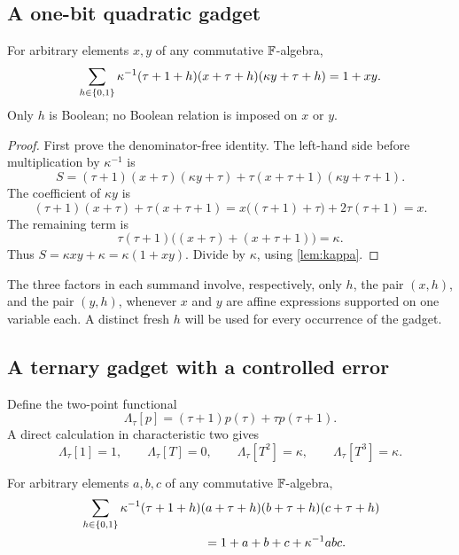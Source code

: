 \subsection{A one-bit quadratic gadget}

\begin{lemma}\label{lem:quadratic}
For arbitrary elements \(x,y\) of any commutative \(\mathbb{F}\)-algebra,
\[
\sum_{h\in\{0,1\}}
  \kappa^{-1}(\tau+1+h)(x+\tau+h)(\kappa y+\tau+h)
 =1+xy.
\]
Only \(h\) is Boolean; no Boolean relation is imposed on \(x\) or \(y\).
\end{lemma}

\begin{proof}
First prove the denominator-free identity.  The left-hand side before multiplication by
\(\kappa^{-1}\) is
\[
 S=(\tau+1)(x+\tau)(\kappa y+\tau)
   +\tau(x+\tau+1)(\kappa y+\tau+1).
\]
The coefficient of \(\kappa y\) is
\[
 (\tau+1)(x+\tau)+\tau(x+\tau+1)
 =x\bigl((\tau+1)+\tau\bigr)
   +2\tau(\tau+1)=x.
\]
The remaining term is
\[
 \tau(\tau+1)\bigl((x+\tau)+(x+\tau+1)\bigr)=\kappa.
\]
Thus \(S=\kappa xy+\kappa=\kappa(1+xy)\).  Divide by \(\kappa\), using
\cref{lem:kappa}.
\end{proof}

The three factors in each summand involve, respectively, only \(h\), the pair \((x,h)\),
and the pair \((y,h)\), whenever \(x\) and \(y\) are affine expressions supported on one
variable each.  A distinct fresh \(h\) will be used for every occurrence of the gadget.

\subsection{A ternary gadget with a controlled error}

Define the two-point functional
\[
 \Lambda_\tau[p]
   =(\tau+1)p(\tau)+\tau p(\tau+1).
\]
A direct calculation in characteristic two gives
\[
 \Lambda_\tau[1]=1,
 \qquad
 \Lambda_\tau[T]=0,
 \qquad
 \Lambda_\tau[T^2]=\kappa,
 \qquad
 \Lambda_\tau[T^3]=\kappa.
\]

\begin{lemma}\label{lem:ternary}
For arbitrary elements \(a,b,c\) of any commutative \(\mathbb{F}\)-algebra,
\begin{align*}
&\sum_{h\in\B}
 \kappa^{-1}(\tau+1+h)(a+\tau+h)(b+\tau+h)(c+\tau+h)\\
&\hspace{35mm}=1+a+b+c+\kappa^{-1}abc.
\end{align*}
\end{lemma}

